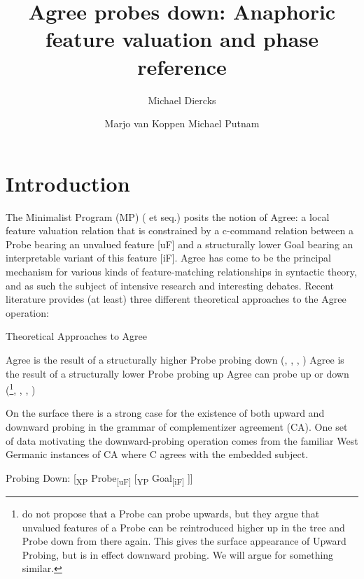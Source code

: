 \documentclass[output=paper
,modfonts
,nonflat
]{langsci/langscibook}
\title{Agree probes down: Anaphoric feature valuation and phase reference
}
\author{Michael Diercks\affiliation{Pomona College}\and 
 Marjo van Koppen\affiliation{Utrecht University/Meertens Institute}\lastand 
 Michael Putnam\affiliation{Penn State University}
}
\begin{document}
\maketitle


\section{Introduction} \label{Introduction}

The Minimalist Program (MP) (\citealt{Chomsky2000} et seq.) posits the notion of Agree: a local feature valuation relation that is constrained by a c-command relation between a Probe bearing an unvalued feature [uF] and a structurally lower Goal bearing an interpretable variant of this feature [iF]. Agree has come to be the principal mechanism for various kinds of feature-matching relationships in syntactic theory, and as such the subject of intensive research and interesting debates. Recent literature provides (at least) three different theoretical approaches to the Agree operation:

\ea
Theoretical Approaches to Agree \label{TheoryApproaches}
\begin{xlist}
\ex Agree is the result of a structurally higher Probe probing down (\citealt{Chomsky2000}, \citealt{Chomsky:2001}, \citealt{Preminger:2013}, \citealt{Polinsky:2015}) 
\ex Agree is the result of a structurally lower Probe probing up \citep{Zeijlstra:2012, Wurmbrand:2011, Bjorkman:toappearb} 
\ex Agree can probe up or down (\citealt{Bejar:2009}\footnote{\citet{Bejar:2009} do not propose that a Probe can probe upwards, but they argue that unvalued features of a Probe can be reintroduced higher up in the tree and Probe down from there again. This gives the surface appearance of Upward Probing, but is in effect downward probing. We will argue for something similar.}, \citealt{Baker:2008}, \citealt{Putnam:2011}, \citealt{Carstens:2016})
\end{xlist}
\z
\noindent On the surface there is a strong case for the existence of both upward and downward probing in the grammar of complementizer agreement (CA). One set of data motivating the downward-probing operation comes from the familiar West Germanic instances of CA where C agrees with the embedded subject.

\ea \label{ProbeDownSchematic}
Probing Down: [\textsubscript{XP} Probe\textsubscript{[uF]} [\textsubscript{YP} Goal\textsubscript{[iF]} ]]
\z
\end{document}
